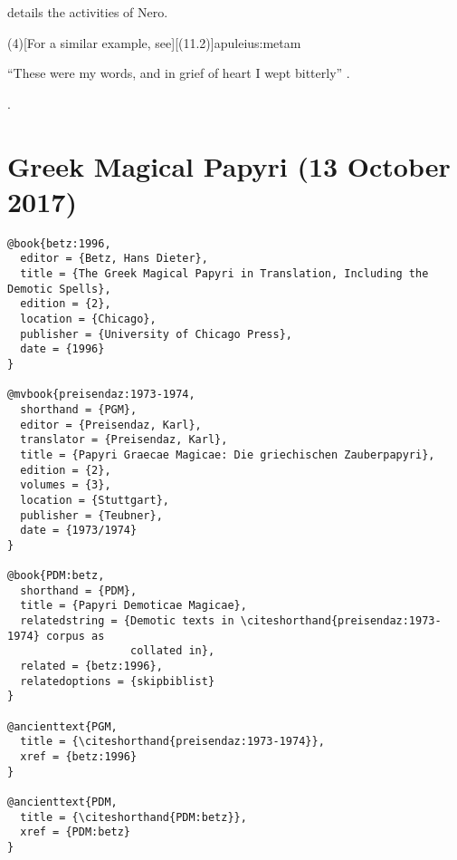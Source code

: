 \documentclass[a4paper]{article}
\renewcommand\footnote[1]{##1}%
\begin{document}
\begin{verbcite}
  \cite[(15)]{tacitus:ann} details the activities of Nero.
\end{verbcite}
\examplecite(4)[For a similar example, see][(11.2)]{apuleius:metam}
\begin{verbcite}
  “These were my words, and in grief of heart I wept bitterly”
  .
\end{verbcite}
\cite{apuleius:golden}.
\exampleancientsources
\examplesecondarysources
\examplebibliography
{}

\section{Greek Magical Papyri (13 October 2017)}

\begin{verbatim}
@book{betz:1996,
  editor = {Betz, Hans Dieter},
  title = {The Greek Magical Papyri in Translation, Including the Demotic Spells},
  edition = {2},
  location = {Chicago},
  publisher = {University of Chicago Press},
  date = {1996}
}

@mvbook{preisendaz:1973-1974,
  shorthand = {PGM},
  editor = {Preisendaz, Karl},
  translator = {Preisendaz, Karl},
  title = {Papyri Graecae Magicae: Die griechischen Zauberpapyri},
  edition = {2},
  volumes = {3},
  location = {Stuttgart},
  publisher = {Teubner},
  date = {1973/1974}
}

@book{PDM:betz,
  shorthand = {PDM},
  title = {Papyri Demoticae Magicae},
  relatedstring = {Demotic texts in \citeshorthand{preisendaz:1973-1974} corpus as
                   collated in},
  related = {betz:1996},
  relatedoptions = {skipbiblist}
}

@ancienttext{PGM,
  title = {\citeshorthand{preisendaz:1973-1974}},
  xref = {betz:1996}
}

@ancienttext{PDM,
  title = {\citeshorthand{PDM:betz}},
  xref = {PDM:betz}
}
\end{verbatim}
\end{document}
